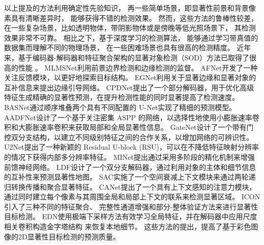 



以上提及的方法利用确定性先验知识，
再一些简单场景，即显著性前景和背景像素具有清晰差异时，
能够获得不错的检测效果。
然而，这些方法的鲁棒性较差，
在一些复杂场景，比如透明物体，带阴影物体或是傍晚等低光照场景下，
其检测效果非常不可靠。
相比之下，基于深度学习的检测算法，
能够通过学习带真值的数据集而理解不同的物理场景，
在一些困难场景也具有很高的检测精度。
近年来，基于编码器-解码器和特征聚合架构的显著对象检测（SOD）方法已取得了很高的性能
。
MLMSNet利用前景边界检测和边缘检测的监督。
AFNet开发了一种关注反馈模块，以更好地探索目标结构。
EGNet利用关于显著边缘和显著对象的互补信息来提出边缘引导网络。
CPDNet提出了一个部分解码器，用于优化高级特征生成精确的显著性预测，在提升检测性能的同时显著提高了检测速度。
BASNet通过顺序堆叠两个具有不同配置的
U-Net实现了精细的预测模型。
AADFNet设计了一个基于关注密集 ASPP 的网络，以选择性地使用小膨胀速率卷积和大膨胀速率卷积来获取局部和全局显著性信息。
GateNet设计了一个带有门控双分支结构，以建立不同级别特征之间的合作关系，以增加网络的可辨识性。
U2Net提出了一种新颖的 Residual U-block (RSU)，可以在不降低特征映射分辨率的情况下获得内部多分辨率特征。
MINet提出通过采用多阶段的精化机制来增强前馈神经网络。
LDF设计了一个双分支解码器，通过利用对象的主体和细节信息的互补性来预测显著性地图。
SAC实施了一个空间衰减上下文模块来通过两轮递归转换传播和聚合显著特征。
CANet提出了一个具有上下文感知的注意力模块，通过同时建立每个像素与其周围全局和局部上下文的联系来检测显著区域。
ICON引入了三种不同的特征聚合、
完整性通道增强和部分-整体验证方法来进行显著性目标检测。
EDN使用极端下采样方法有效学习全局特征，并在解码器中应用尺度相关卷积构造金字塔结构 
来恢复本地细节。
这些方法的提出，提高了基于彩色图像的2D显著性目标检测的预测质量。







